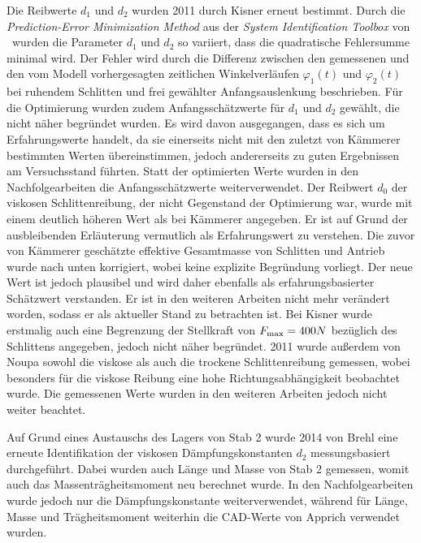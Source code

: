 Die Reibwerte $d_1$ und $d_2$ wurden 2011 durch Kisner \cite{kisner} erneut bestimmt. Durch die \textit{Prediction-Error Minimization Method} aus der \textit{System Identification Toolbox} von \Matlab\ wurden die Parameter $d_1$ und $d_2$ so variiert, dass die quadratische Fehlersumme minimal wird. Der Fehler wird durch die Differenz zwischen den gemessenen und den vom Modell vorhergesagten zeitlichen Winkelverläufen $\varphi_1(t)$ und $\varphi_2(t)$ bei ruhendem Schlitten und frei gewählter Anfangsauslenkung beschrieben. Für die Optimierung wurden zudem Anfangsschätzwerte für $d_1$ und $d_2$ gewählt, die nicht näher begründet wurden. Es wird davon ausgegangen, dass es sich um Erfahrungswerte handelt, da sie einerseits nicht mit den zuletzt von Kämmerer \cite{kämmerer} bestimmten Werten übereinstimmen, jedoch andererseits zu guten Ergebnissen am Versuchsstand führten. Statt der optimierten Werte wurden in den Nachfolgearbeiten die Anfangsschätzwerte weiterverwendet. Der Reibwert $d_0$ der viskosen Schlittenreibung, der nicht Gegenstand der Optimierung war, wurde mit einem deutlich höheren Wert als bei Kämmerer \cite{kämmerer} angegeben. Er ist auf Grund der ausbleibenden Erläuterung vermutlich als Erfahrungswert zu verstehen. Die zuvor von Kämmerer \cite{kämmerer} geschätzte effektive Gesamtmasse von Schlitten und Antrieb wurde nach unten korrigiert, wobei keine explizite Begründung vorliegt. Der neue Wert ist jedoch plausibel und wird daher ebenfalls als erfahrungsbasierter Schätzwert verstanden. Er ist in den weiteren Arbeiten nicht mehr verändert worden, sodass er als aktueller Stand zu betrachten ist. Bei Kisner \cite{kisner} wurde erstmalig auch eine Begrenzung der Stellkraft von $F_{\mathrm{max}}=400 N$ bezüglich des Schlittens angegeben, jedoch nicht näher begründet. 2011 wurde außerdem von Noupa \cite{noupa} sowohl die viskose als auch die trockene Schlittenreibung gemessen, wobei besonders für die viskose Reibung eine hohe Richtungsabhängigkeit beobachtet wurde. Die gemessenen Werte wurden in den weiteren Arbeiten jedoch nicht weiter beachtet.

Auf Grund eines Austauschs des Lagers von Stab 2 wurde 2014 von Brehl \cite{brehl} eine erneute Identifikation der viskosen Dämpfungskonstanten $d_2$ messungsbasiert durchgeführt. Dabei wurden auch Länge und Masse von Stab 2 gemessen, womit auch das Massenträgheitsmoment neu berechnet wurde. In den Nachfolgearbeiten wurde jedoch nur die Dämpfungskonstante weiterverwendet, während für Länge, Masse und Trägheitsmoment weiterhin die CAD-Werte von Apprich \cite{apprich} verwendet wurden.  

